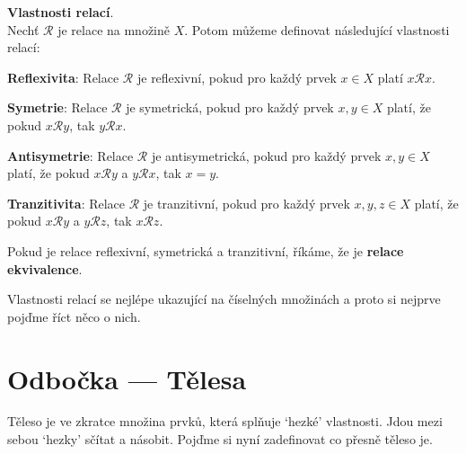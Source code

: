 \begin{definitionbox}
  \textbf{Vlastnosti relací}. \\
    Nechť $\mathcal R$ je relace na množině $X$. Potom můžeme definovat následující vlastnosti relací: \vspace{5mm}

    \textbf{Reflexivita}: Relace $\mathcal R$ je reflexivní, pokud pro každý prvek $x\in X$ platí $x\mathcal Rx$.\ \vspace{1mm}

    \textbf{Symetrie}: Relace $\mathcal R$ je symetrická, pokud pro každý prvek $x, y\in X$ platí, že pokud $x\mathcal Ry$, tak $y\mathcal Rx$.\ \vspace{1mm}

    \textbf{Antisymetrie}: Relace $\mathcal R$ je antisymetrická, pokud pro každý prvek $x, y\in X$ platí, že pokud $x\mathcal Ry$ a $y\mathcal Rx$, tak $x = y$.\ \vspace{1mm}

    \textbf{Tranzitivita}: Relace $\mathcal R$ je tranzitivní, pokud pro každý prvek $x, y, z\in X$ platí, že pokud $x\mathcal Ry$ a $y\mathcal Rz$, tak $x\mathcal Rz$.\ \vspace{1mm}

  Pokud je relace reflexivní, symetrická a tranzitivní, říkáme, že je \textbf{relace ekvivalence}.
\end{definitionbox}

Vlastnosti relací se nejlépe ukazující na číselných množinách a proto si nejprve pojďme říct něco o nich.

\section{Odbočka --- Tělesa}
Těleso je ve zkratce množina prvků, která splňuje `hezké' vlastnosti. Jdou mezi sebou `hezky' sčítat a násobit. Pojďme si nyní zadefinovat co přesně těleso je.

